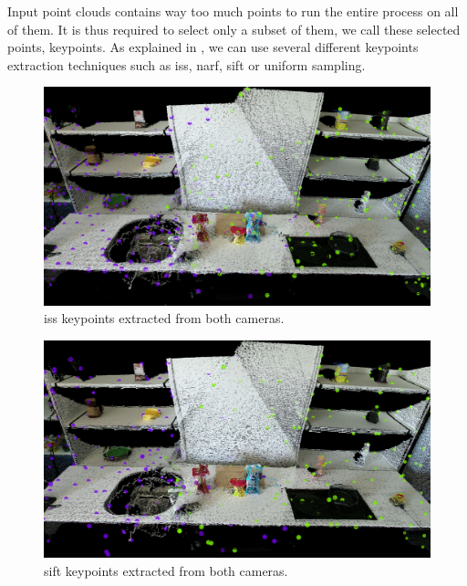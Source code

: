    Input point clouds contains way too much points to run the entire process on all of them. It is thus required to select only a subset of them, we call these selected points, keypoints. As explained in \cite{pcl_feat}, we can use several different keypoints extraction techniques such as \acrshort{iss}, \acrshort{narf}, \acrshort{sift} or uniform sampling. \\
    
    \begin{figure}[h!]
        \centering
        \includegraphics[width=\textwidth]{images/iss_50.png}
        \caption{\acrshort{iss} keypoints extracted from both cameras.}
        \label{fig:iss_kp}
    \end{figure}
    
    \begin{figure}[h!]
        \centering
        \includegraphics[width=\textwidth]{images/sift_30.png}
        \caption{\acrshort{sift} keypoints extracted from both cameras.}
        \label{fig:sift_kp}
    \end{figure}
    
